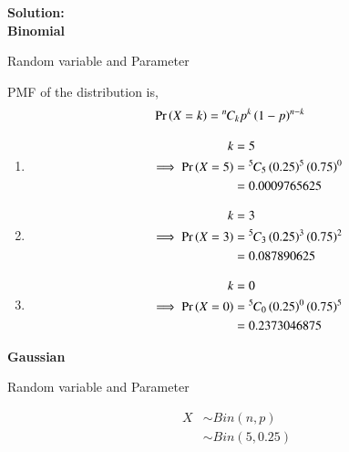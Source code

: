 \documentclass[journal,11pt,onecolumn]{IEEEtran}
\providecommand{\pr}[1]{\ensuremath{\Pr\left(#1\right)}}
\providecommand{\brak}[1]{\ensuremath{\left(#1\right)}}
\newcommand{\solution}{\noindent \textbf{Solution: }}
\providecommand{\pr}[1]{\ensuremath{\Pr\left(#1\right)}}
\newcommand*{\permcomb}[4][0mu]{{{}^{#3}\mkern#1#2_{#4}}}
\newcommand*{\comb}[1][-1mu]{\permcomb[#1]{C}}
\begin{document}
\solution\\
\textbf{Binomial}\\
\begin{table}[ht!]
	\centering
	
	\caption{Random variable and Parameter}
	\label{tab:gausstab1_9.3.3}
\end{table}
PMF of the distribution is,
\begin{align}
	\pr{X=k}&=\comb{n}{k}p^k\brak{1-p}^{n-k}
\end{align}
\begin{enumerate}
	\item
	\begin{align}
	k&=5\\
	\implies \pr{X=5}&=\comb{5}{5}\brak{0.25}^5\brak{0.75}^0\\
	&=0.0009765625
\end{align}
	\item
	\begin{align}
	k&=3\\
	\implies\pr{X=3}&=\comb{5}{3}\brak{0.25}^3\brak{0.75}^2\\
	&=0.087890625
\end{align}
	\item
	\begin{align}
	k&=0\\
	\implies\pr{X=0}&=\comb{5}{0}\brak{0.25}^0\brak{0.75}^5\\
	&=0.2373046875
\end{align}
\end{enumerate}
\textbf{Gaussian}\\
\begin{table}[ht!]
	\centering
	
	\caption{Random variable and Parameter}
	\label{tab:gausstab2_9.3.3}
\end{table}
\begin{align}
	X &\sim Bin\brak{n,p}\\
	&\sim Bin\brak{5,0.25}
\end{align}
\end{document}
